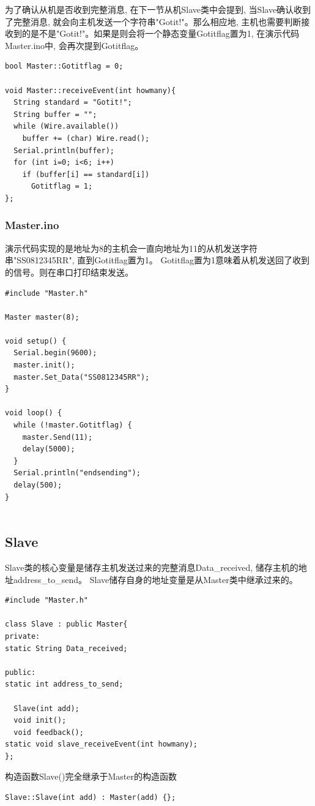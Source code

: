 \documentclass{article}
\begin{document}
为了确认从机是否收到完整消息, 在下一节从机Slave类中会提到, 当Slave确认收到了完整消息, 就会向主机发送一个字符串"Gotit!"。那么相应地, 
主机也需要判断接收到的是不是"Gotit!"。如果是则会将一个静态变量Gotitflag置为1, 在演示代码Master.ino中, 会再次提到Gotitflag。
\begin{lstlisting}
bool Master::Gotitflag = 0;

void Master::receiveEvent(int howmany){
  String standard = "Gotit!";
  String buffer = "";
  while (Wire.available()) 
    buffer += (char) Wire.read();
  Serial.println(buffer);
  for (int i=0; i<6; i++)
    if (buffer[i] == standard[i])
      Gotitflag = 1;
};  
\end{lstlisting}

\subsubsection{Master.ino}
演示代码实现的是地址为8的主机会一直向地址为11的从机发送字符串"SS0812345RR", 直到Gotitflag置为1。 
Gotitflag置为1意味着从机发送回了收到的信号。则在串口打印结束发送。
\begin{lstlisting}
#include "Master.h"

Master master(8);

void setup() {
  Serial.begin(9600);
  master.init();
  master.Set_Data("SS0812345RR");
}

void loop() {
  while (!master.Gotitflag) {
    master.Send(11);
    delay(5000);
  }
  Serial.println("endsending");
  delay(500);
}
  
\end{lstlisting}

\subsection{Slave}
Slave类的核心变量是储存主机发送过来的完整消息Data\_received, 储存主机的地址address\_to\_send。
Slave储存自身的地址变量是从Master类中继承过来的。
\begin{lstlisting}
#include "Master.h"

class Slave : public Master{
private:
static String Data_received;

public:
static int address_to_send;

  Slave(int add);
  void init();
  void feedback();
static void slave_receiveEvent(int howmany);
};  
\end{lstlisting}

构造函数Slave()完全继承于Master的构造函数
\begin{lstlisting}
Slave::Slave(int add) : Master(add) {};  
\end{lstlisting}
\end{document}
